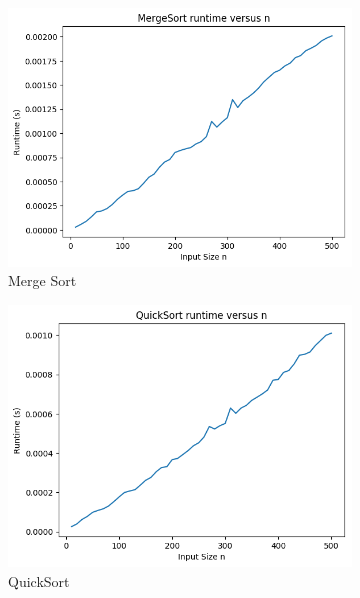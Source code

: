 \documentclass{article}
\begin{document}
\begin{figure}[H]
	\centering
	\begin{subfigure}{.3\textwidth}
		\includegraphics[width=\textwidth]{../results/normal/MergeSort.png}
		\caption{Merge Sort}
	\end{subfigure}
	\begin{subfigure}{.3\textwidth}
		\includegraphics[width=\textwidth]{../results/normal/QuickSort.png}
		\caption{QuickSort}
	\end{subfigure}
	\begin{subfigure}{.3\textwidth}

\end{subfigure}
\end{figure}
\end{document}
